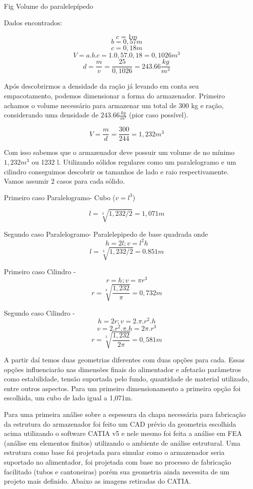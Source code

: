 Fig Volume do paralelepípedo

Dados encontrados:

\[c = 1m\]
\[b = 0,57m\]
\[c = 0,18m\]
\[V = a.b.c = 1 . 0,57 . 0,18 = 0,1026 m^3\]
\[d = \frac{m}{v} = \frac{25}{0,1026} = 243.66 \frac{kg}{m^3}\]

Após descobrirmos a densidade da ração já levando em conta seu empacotamento, podemos dimensionar a forma do armazenador. Primeiro achamos o volume necessário para armazenar um total de 300 kg e ração, considerando uma densidade de $243.66 \frac{kg}{m^3}$ (pior caso possível).

\[V = \frac{m}{d} = \frac{300}{244} = 1,232m^3\]


Com isso sabemos que o armazenador deve possuir um volume de no mínimo $1,232m^3$ ou 1232 l. Utilizando sólidos regulares como um paralelogramo e um cilindro conseguimos descobrir os tamanhos de lado e raio respectivamente. Vamos assumir 2 casos para cada sólido.

Primeiro caso Paralelogramo- Cubo ($v=l^3$)

\[l = \sqrt[3]{1,232/2} = 1,071m\]

Segundo caso Paralelogramo- Paralelepipedo de base quadrada onde \[h = 2l ; v=l^2h\]
\[l = \sqrt[3]{1,232/2} = 0.851 m\]

Primeiro caso Cilindro -\[r = h ; v =\pi r^3\]
\[r = \sqrt[3]{\frac{1,232}{\pi}} = 0,732 m\]

Segundo caso Cilindro -\[h = 2r; v=2.\pi.r^2.h\]
\[v = 2.r^2.\pi .h = 2\pi.r^3\]
\[r = \sqrt[3]{\frac{1,232}{2\pi}} = 0,581 m\]

A partir daí temos duas geometrias diferentes com duas opções para cada. Essas opções influenciarão nas dimensões finais do alimentador e afetarão parâmetros como estabilidade, tensão suportada pelo fundo, quantidade de material utilizado, entre outros aspectos. Para um primeiro dimensionamento a primeira opção foi escolhida, um cubo de lado igual a 1,071m.


Para uma primeira análise sobre a espessura da chapa necessária para fabricação da estrutura do armazenador foi feito um CAD prévio da geometria escolhida acima utilizando o software CATIA v5 e nele mesmo foi feita a análise em FEA (análise em elementos finitos) utilizando o ambiente de análise estrutural. Uma estrutura como base foi projetada para simular como o armazenador seria suportado no alimentador, foi projetada com base no processo de fabricação facilitado (tubos e cantoneiras) porém sua geometria ainda necessita de um projeto mais definido. Abaixo as imagens retiradas do CATIA.

